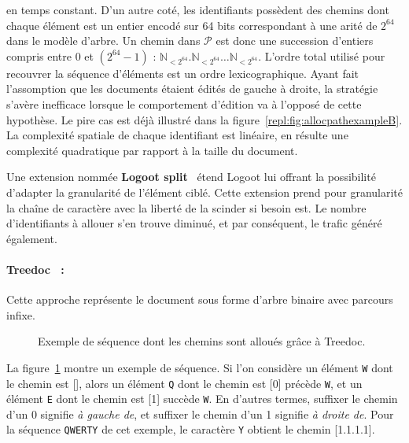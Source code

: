 en temps constant. D'un autre coté, les identifiants possèdent des chemins dont
chaque élément est un entier encodé sur 64 bits correspondant à une arité de
$2^{64}$ dans le modèle d'arbre. Un chemin dans $\mathcal{P}$ est donc une
succession d'entiers compris entre 0 et $(2^{64}-1)$ :
$\mathbb{N}_{<2^{64}}.\mathbb{N}_{<2^{64}}\ldots\mathbb{N}_{<2^{64}}$.  L'ordre
total utilisé pour recouvrer la séquence d'éléments est un ordre
lexicographique. Ayant fait l'assomption que les documents étaient édités de
gauche à droite, la stratégie s'avère inefficace lorsque le comportement
d'édition va à l'opposé de cette hypothèse. Le pire cas est déjà illustré dans
la figure~\ref{repl:fig:allocpathexampleB}. La complexité spatiale de chaque
identifiant est linéaire, en résulte une complexité quadratique par rapport à la
taille du document.

\noindent Une extension nommée \textbf{Logoot split}~\cite{andre2013supporting}
étend Logoot lui offrant la possibilité d'adapter la granularité de l'élément
ciblé.  Cette extension prend pour granularité la chaîne de caractère avec la
liberté de la scinder si besoin est. Le nombre d'identifiants à allouer s'en
trouve diminué, et par conséquent, le trafic généré également.

\paragraph{Treedoc~\cite{letia2009crdts, preguica2009commutative} :} Cette
approche représente le document sous forme d'arbre binaire avec parcours infixe.
  
\begin{figure}
  \begin{center}
    
    \caption[Chemins alloués par Treedoc]
    {\label{repl:fig:treedocexample}Exemple de séquence dont les chemins sont
      alloués grâce à Treedoc.}
  \end{center}
\end{figure}

\noindent La figure~\ref{repl:fig:treedocexample} montre un exemple de
séquence. Si l'on considère un élément \texttt{W} dont le chemin est [], alors
un élément \texttt{Q} dont le chemin est [0] précède \texttt{W}, et un élément
\texttt{E} dont le chemin est [1] succède \texttt{W}. En d'autres termes,
suffixer le chemin d'un 0 signifie \emph{à gauche de}, et suffixer le chemin
d'un 1 signifie \emph{à droite de}. Pour la séquence \texttt{QWERTY} de cet
exemple, le caractère \texttt{Y} obtient le chemin [1.1.1.1].
  
